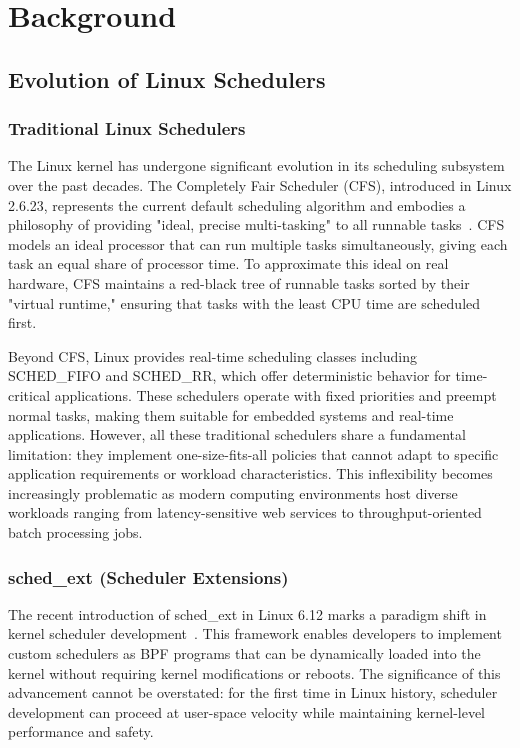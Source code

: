 \section{Background}

\subsection{Evolution of Linux Schedulers}

\subsubsection{Traditional Linux Schedulers}

The Linux kernel has undergone significant evolution in its scheduling subsystem over the past decades. The Completely Fair Scheduler (CFS), introduced in Linux 2.6.23, represents the current default scheduling algorithm and embodies a philosophy of providing "ideal, precise multi-tasking" to all runnable tasks~\cite{wong2008cfs}. CFS models an ideal processor that can run multiple tasks simultaneously, giving each task an equal share of processor time. To approximate this ideal on real hardware, CFS maintains a red-black tree of runnable tasks sorted by their "virtual runtime," ensuring that tasks with the least CPU time are scheduled first.

Beyond CFS, Linux provides real-time scheduling classes including SCHED\_FIFO and SCHED\_RR, which offer deterministic behavior for time-critical applications. These schedulers operate with fixed priorities and preempt normal tasks, making them suitable for embedded systems and real-time applications. However, all these traditional schedulers share a fundamental limitation: they implement one-size-fits-all policies that cannot adapt to specific application requirements or workload characteristics. This inflexibility becomes increasingly problematic as modern computing environments host diverse workloads ranging from latency-sensitive web services to throughput-oriented batch processing jobs.

\subsubsection{sched\_ext (Scheduler Extensions)}

The recent introduction of sched\_ext in Linux 6.12 marks a paradigm shift in kernel scheduler development~\cite{schedext2024}. This framework enables developers to implement custom schedulers as BPF programs that can be dynamically loaded into the kernel without requiring kernel modifications or reboots. The significance of this advancement cannot be overstated: for the first time in Linux history, scheduler development can proceed at user-space velocity while maintaining kernel-level performance and safety.


